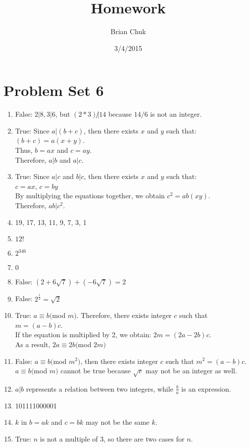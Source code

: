 \documentclass[11pt]{article}
\title{\textbf{Homework}}
\author{Brian Chuk}
\date{3/4/2015}
\begin{document}
\maketitle

\section{Problem Set 6}
\begin{enumerate}
\item False: $2|8, 3|6$, but $(2*3)\not|14$ because $14/6$ is not an integer.
\item True: Since $a|(b + c)$, then there exists $x$ and $y$ such that: \\$(b+c) = a(x+y)$.\\ Thus, $b = ax$ and $c = ay$.\\Therefore, $a|b$ and $a|c$.
\item True: Since $a|c$ and $b|c$, then there exists $x$ and $y$ such that: \\$c=ax$, $c=by$\\ By multiplying the equations together, we obtain $c^2=ab(xy)$. \\Therefore, $ab|c^2$.
\item 19, 17, 13, 11, 9, 7, 3, 1
\item $12!$
\item $2^346$
\item $0$
\item False: $(2 + 6\sqrt7) + (-6\sqrt7) = 2$
\item False: $2^{\frac{1}{2}} = \sqrt2$
\item True: $a \equiv b($mod $ m) $. Therefore, there exists integer $c$ such that $m = (a-b)c$.\\
If the equation is multiplied by 2, we obtain: $2m = (2a-2b)c$.\\
As a result, $2a \equiv 2b($mod $ 2m) $
\item False: $a \equiv b($mod $ m^2) $, then there exists integer $c$ such that $m^2 = (a-b)c$.\\
$a \equiv b($mod $ m) $ cannot be true because $\sqrt{c}$ may not be an integer as well.
\item $a|b$ represents a relation between two integers, while $\frac{b}{a}$ is an expression.
\item 101111000001
\item $k$ in $b = ak$ and $c = bk$ may not be the same $k$.
\item True: $n$ is not a multiple of 3, so there are two cases for $n$.\\

\end{enumerate}
\end{document}
